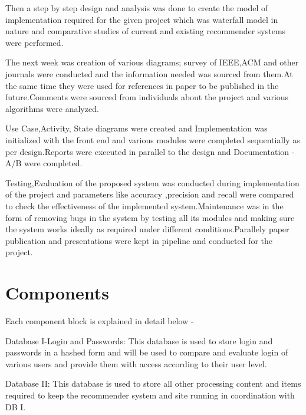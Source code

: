 \documentclass[a4paper,12pt]{report}
\begin{document}
\par Then a step by step design and analysis was done to create the model of implementation required for the given project which was waterfall model in nature and comparative studies of current and existing recommender systems were performed.\\

\par The next week was creation of various diagrams; survey of IEEE,ACM and other journals were conducted and the information needed was sourced from them.At the same time they were used for references in paper to be published in the future.Comments were sourced from individuals about the project and various algorithms were analyzed.\\

\par Use Case,Activity, State diagrams were created and Implementation was initialized with the front end and various modules were completed sequentially as per design.Reports were executed in parallel to the design and Documentation - A/B were completed.\\

\par Testing,Evaluation of the proposed system was conducted during implementation of the project and parameters like accuracy ,precision and recall were compared to check the effectiveness of the implemented system.Maintenance was in the form of removing bugs in the system by testing all its modules and making sure the system works ideally as
required under different conditions.Parallely paper publication and presentations were kept in pipeline and conducted for the project.\\

\section{Components}

\par Each component block is explained in detail below -
\par Database I-Login and Passwords: This database is used to store login
and passwords in a hashed form and will be used to compare and
evaluate login of various users and provide them with access according
to their user level.\\

\par Database II: This database is used to store all other processing content
and items required to keep the recommender system and site running in
coordination with DB I.\\
\end{document}
